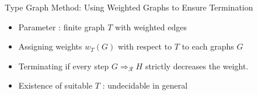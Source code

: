 \documentclass{beamer}
\newcommand{\graphbox}[8]{
  \begin{scope}[xshift=#2,yshift=#3]
    \draw [rounded corners=2mm] (0,0) rectangle (#4,-#5);
    \node at (0,0mm) [anchor=north west,inner sep=1mm] {#1};
    \begin{scope}[xshift=#4/2+#6,yshift=#7] 
    #8
    \end{scope}
  \end{scope}
}
\begin{document}

\begin{frame}{Type Graph Method: Using Weighted Graphs to Ensure Termination
  }

    \begin{itemize}
      \item Parameter : finite graph \( T \) with weighted edges
      \item Assigning weights $w_T(G)$ with respect to $T$ to each graphs $G$
      \item \alert{Terminating} if every step $G \Rightarrow_\mathcal{R} H$ strictly decreases the weight.
      \item \alert{Existence} of suitable $T$ : \alert{undecidable} in general
    \end{itemize}

    
     



\end{frame}
\end{document}

